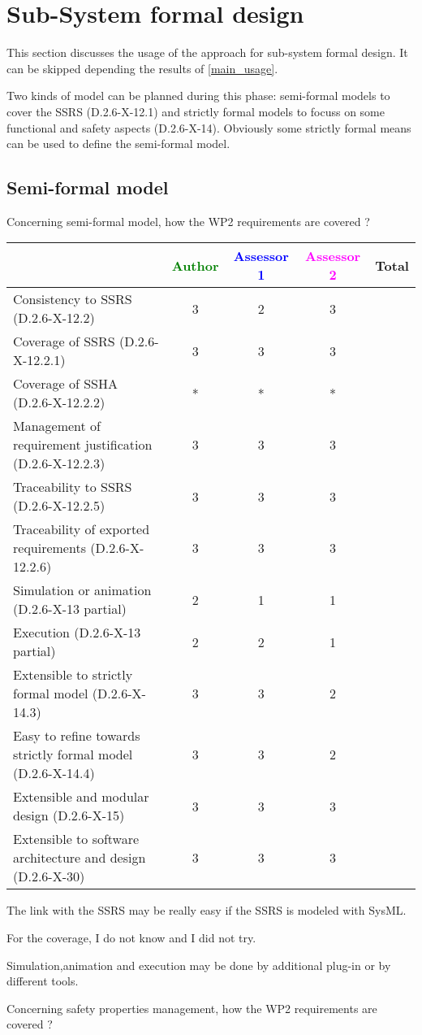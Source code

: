 \section{Sub-System formal design}
This section discusses the usage of the approach for sub-system formal design.
It can be skipped depending the results of \ref{main_usage}.

Two kinds of model can be planned during this phase: semi-formal models to  cover the SSRS (D.2.6-X-12.1) and strictly formal  models to  focuss on some functional and safety aspects (D.2.6-X-14).  Obviously some strictly  formal means can be used to define the semi-formal  model.

\subsection{Semi-formal model}

Concerning semi-formal model, how the WP2 requirements are covered ?

\begin{tabular}{|l | c | c | c | c|}
\hline
& \textcolor{green}{Author} & \textcolor{blue}{Assessor 1} & \textcolor{magenta}{Assessor 2} & Total \\
\hline 
Consistency to SSRS (D.2.6-X-12.2) &3 &2 & 3&  \\
\hline
Coverage of SSRS (D.2.6-X-12.2.1)  &3 & 3& 3&  \\
\hline
Coverage of SSHA (D.2.6-X-12.2.2)  & * & *& *&  \\
\hline
Management of requirement justification (D.2.6-X-12.2.3)  &3 & 3& 3&  \\
\hline
Traceability to  SSRS (D.2.6-X-12.2.5)  & 3 & 3& 3&  \\
\hline
Traceability of exported requirements (D.2.6-X-12.2.6)  &3 & 3& 3&  \\
\hline
Simulation or animation (D.2.6-X-13 partial)  &2 & 1& 1&  \\
\hline
Execution (D.2.6-X-13 partial)  &2 & 2& 1&  \\
\hline
Extensible to strictly formal model (D.2.6-X-14.3) &3 & 3& 2&  \\
\hline
Easy to  refine towards strictly formal model (D.2.6-X-14.4) &3 & 3& 2&  \\
\hline
Extensible and modular design (D.2.6-X-15)  &3 & 3& 3&  \\
\hline
Extensible to software architecture and design (D.2.6-X-30)   &3 & 3& 3&  \\
\hline
\end{tabular}
\begin{author_comment}
The link with the SSRS may be really easy if the SSRS is modeled
with SysML.

For the coverage, I do not know and I did not try.


Simulation,animation  and execution may be done by additional plug-in
or by different tools.
\end{author_comment}
Concerning safety properties management, how the WP2 requirements are covered ?

